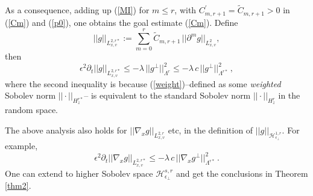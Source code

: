 \documentclass[final,onefignum,onetabnum]{siamart171218}
\newcounter{example}
\begin{document}
As a consequence, adding up (\ref{MI}) for $m\leq r$, with $C_{m,r+1}^{\prime}=\widetilde C_{m,r+1}>0$ in (\ref{Cm}) and (\ref{p0}), 
one obtains the goal estimate (\ref{Cm}). Define 
\begin{equation}\label{weight} ||g||_{L_{x,v}^{2,r\ast}}:= \sum_{m=0}^{r} \widetilde C_{m,r+1}\, ||\partial^m g||_{L^2_{x,v}}, \end{equation}
then \begin{equation}\label{LL2}\epsilon^2 \partial_t ||g||_{L_{x,v}^{2,r\ast}} \leq -\lambda\, ||g^{\perp}||_{\Lambda^r}^2 \leq -\lambda\, c\, ||g^{\perp}||_{\Lambda^{r\ast}}^2\,, \end{equation}
where the second inequality is because (\ref{weight})--defined as some {\it weighted} Sobolev norm
$||\cdot||_{H_z^{r\ast}}$-- is equivalent to the standard Sobolev norm $||\cdot||_{H_z^{r}}$ in the random space. 

The above analysis also holds for $||\nabla_x g||_{L_{x,v}^{2,r}}$ etc, in the definition of $||g||_{\mathcal H_{\epsilon_{\perp}}^{1,r}}$. For example, 
$$\epsilon^2 \partial_t ||\nabla_x g||_{L_{x,v}^{2,r\ast}} \leq -\lambda\, c\, ||\nabla_x g^{\perp}||_{\Lambda^{r\ast}}^2\,. $$
One can extend to higher Sobolev space $\mathcal H_{\epsilon_{\perp}}^{s,r}$ and get the conclusions in Theorem \ref{thm2}. \\[4pt]
\end{document}
